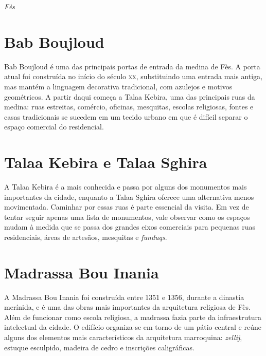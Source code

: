 
\blankpage
\pagebreak
\thispagestyle{empty}
\mbox{}
\begin{center}

\vspace{3cm}

{\brabo\HUGE\itshape Fès}
\end{center}
\pagebreak


\chapter{Bab Boujloud}

Bab Boujloud é uma das principais portas de entrada da medina de Fès. A porta atual foi construída no início do século \textsc{xx}, substituindo uma entrada mais antiga, mas mantém a linguagem decorativa tradicional, com azulejos e motivos geométricos. A partir daqui começa a Talaa Kebira, uma das principais ruas da medina: ruas estreitas, comércio, oficinas, mesquitas, escolas religiosas, fontes e casas tradicionais se sucedem em um tecido urbano em que é difícil separar o espaço comercial do residencial.

\chapter{Talaa Kebira e Talaa Sghira}

A Talaa Kebira é a mais conhecida e passa por alguns dos monumentos mais importantes da cidade, enquanto a Talaa Sghira oferece uma alternativa menos movimentada. Caminhar por essas ruas é parte essencial da visita. Em vez de tentar seguir apenas uma lista de monumentos, vale observar como os espaços mudam à medida que se passa dos grandes eixos comerciais para pequenas ruas residenciais, áreas de artesãos, mesquitas e \textit{funduqs}.

\chapter{Madrassa Bou Inania}

A Madrassa Bou Inania foi construída entre 1351 e 1356, durante a dinastia merínida, e é uma das obras mais importantes da arquitetura religiosa de Fès. Além de funcionar como escola religiosa, a madrassa fazia parte da infraestrutura intelectual da cidade. O edifício organiza-se em torno de um pátio central e reúne alguns dos elementos mais característicos da arquitetura marroquina: \textit{zellij}, estuque esculpido, madeira de cedro e inscrições caligráficas.

